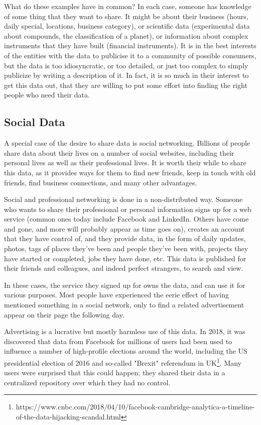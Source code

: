 What do these examples have in common?  In each case, someone has knowledge of some thing that 
they want to share.  It might be about their business (hours, daily special, locations, business category), or 
scientific data (experimental data about compounds, the classification of a planet), or information 
about complex instruments that they have built (financial instruments).   It is in the best interests
of the entities with the data to publicise it to a community of possible consumers, but the 
data is too idiosyncratic, or too detailed, or just too complex to simply publicize by writing a description
of it.   In fact, it is so much in their interest to get this data out, that they are willing to 
put some effort into finding the right people who need their data.  


\subsection{Social Data}

A special case of the desire to share data is social networking.  Billions of 
people share data about their lives on a number of social websites, including 
their personal lives as well as their professional lives.  It is worth their 
while to share this data, as it provides ways for them to find new friends, keep
in touch with old friends, find business connections, and many other advantages. 

Social and professional networking is done in a non-distributed way.  Someone 
who wants to share their professional or personal information signs up for a web 
service (common ones today include Facebook and LinkedIn.  Others have come and gone,
and more will probably appear as time goes on), creates an account that they have control of, and 
they provide data, in the 
form of daily updates, photos, tags of places they've  been and people they've been with, 
projects they have started or completed, jobs they have done, etc.  This data is 
published for their friends and colleagues, and indeed perfect strangers, to 
search and view. 

In these cases, the service they signed up for owns the data, and can use it for 
various purposes.  Most people have experienced the eerie effect of having mentioned
something in a social network, only to find a related advertisement appear on their
page the following day. 

Advertising is a lucrative but mostly harmless use of this data.  In 2018, it 
was discovered that data from Facebook for millions of users had been used 
to influence a number of high-profile elections around the world, including the 
US presidential election of 2016 and so-called "Brexit" referendum in 
UK\footnote{https://www.cnbc.com/2018/04/10/facebook-cambridge-analytica-a-timeline-of-the-data-hijacking-scandal.html}.  Many
users were surprised that this could happen; they shared their data in a centralized
repository over which they had no control.  

